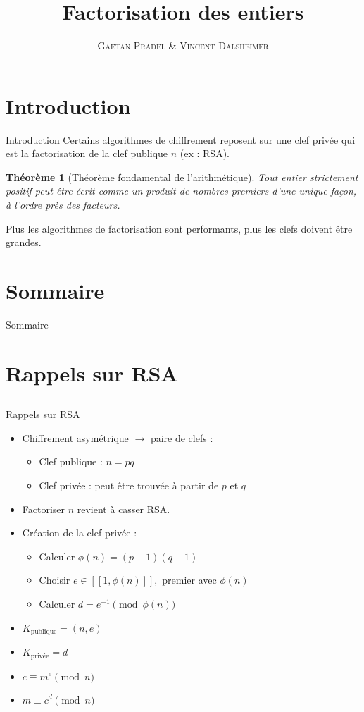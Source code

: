 \documentclass[utf8,10pt,french]{beamer}
\title[FdE]{Factorisation des entiers}
\author[GV]{\textsc{Gaëtan Pradel \& Vincent Dalsheimer}}
\institute{Université Bordeaux 1}
\newtheorem{theoreme}{Th{\'e}or{\`e}me}
\begin{document}
\frame{\titlepage}

\section{Introduction}
\begin{frame}{Introduction}
Certains algorithmes de chiffrement reposent sur une clef privée qui est la factorisation de la clef publique $n$ (ex : RSA). \pause

\begin{theoreme}[Théorème fondamental de l'arithmétique]
Tout entier strictement positif peut être écrit comme un produit de nombres premiers d’une
unique façon, à l’ordre près des facteurs. \pause
\end{theoreme}

Plus les algorithmes de factorisation sont performants, plus les clefs doivent être grandes.
\end{frame}

\section*{Sommaire}
\begin{frame}{Sommaire}
  \tableofcontents
\end{frame}

\section{Rappels sur RSA}
\subsection{}
\begin{frame}{Rappels sur RSA}
\begin{itemize}
\item Chiffrement asymétrique $\to$ paire de clefs :\pause
\begin{itemize}
\item Clef publique : $n = pq$ \pause
\item Clef privée : peut être trouvée à partir de $p$ et $q$ \pause
\end{itemize}
\item Factoriser $n$ revient à casser RSA. \pause
\item Création de la clef privée : \pause 
\begin{itemize}
\item Calculer $\phi(n) = (p - 1)(q - 1)$ \pause
\item Choisir $e \in [\![1, \phi(n)]\!],$ premier avec $\phi(n)$ \pause
\item Calculer $d = e^{-1} \pmod {\phi(n)}$ \pause
\end{itemize}
\item $K_{\text{publique}} = (n, e)$ \pause
\item $K_{\text{privée}} = d$ \pause
\item $c \equiv m^e \pmod n$ \pause
\item $m \equiv c^d \pmod n$
\end{itemize}
\end{frame}
\end{document}
